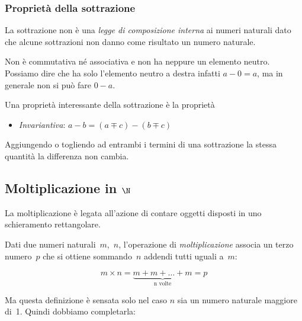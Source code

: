 \subsubsection{Proprietà della sottrazione}

La sottrazione non è una \emph{legge di composizione interna} ai numeri 
naturali dato che alcune sottrazioni non danno come risultato un numero
naturale.

Non è commutativa né associativa e non ha neppure un elemento neutro.
Possiamo dire che ha solo l'elemento neutro a destra infatti \(a - 0 = a\), 
ma in generale non si può fare \(0 - a\).

Una proprietà interessante della sottrazione è la proprietà 
\begin{itemize} [noitemsep]
 \item \emph{Invariantiva}: \(a - b = (a \mp c) - (b \mp c)\)
\end{itemize}

\begin{definizione}
Aggiungendo o togliendo ad entrambi i 
termini di una sottrazione la stessa quantità la differenza non cambia.
\end{definizione}

\subsection{Moltiplicazione in $\N$}

La moltiplicazione è legata all'azione di contare oggetti disposti in uno
schieramento rettangolare.

\begin{definizione}
Dati due numeri naturali~\(m\),~\(n\), l'operazione di \emph{moltiplicazione} 
associa un terzo numero~\(p\) che si ottiene sommando~\(n\) addendi tutti 
uguali a~\(m\):

\begin{inaccessibleblock}[
\[m \times n = \mbox{n volte}{(m + m + \dots + m)} = p\]
]
\[m \times n = \underbrace{m + m + \dots + m}_{\text{n volte}} = p\]
\end{inaccessibleblock}
\end{definizione}

Ma questa definizione è sensata solo nel caso \(n\) sia un numero 
naturale maggiore di~1.
Quindi dobbiamo completarla:

